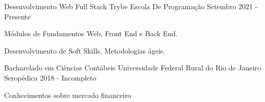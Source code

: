 

\begin{cventries}

\cventry
    {Desenvolvimento Web Full Stack} %
    {Trybe} %
    {Escola De Programação} %
    {Setembro 2021 - Presente} %
    {
      \begin{cvitems} %
        \item {Módulos de Fundamentos Web, Front End e Back End.}
        \item {Desenvolvimento de Soft Skills, Metodologias ágeis.}
      \end{cvitems}
    }
   
   \cventry
    {Bacharelado em Ciências Contábeis} %
    {Universidade Federal Rural do Rio de Janeiro} %
    {Seropédica} %
    {2018 - Incompleto} %
    {
      \begin{cvitems} %
        \item{Conhecimentos sobre mercado financeiro}
      \end{cvitems}
    } 

\end{cventries}
